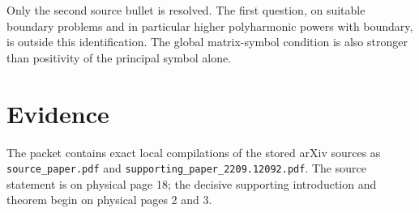 \documentclass[11pt]{article}
\begin{document}
Only the second source bullet is resolved.  The first question, on suitable
boundary problems and in particular higher polyharmonic powers with boundary,
is outside this identification.  The global matrix-symbol condition is also
stronger than positivity of the principal symbol alone.

\section*{Evidence}
The packet contains exact local compilations of the stored arXiv sources as
\texttt{source\_paper.pdf} and
\texttt{supporting\_paper\_2209.12092.pdf}.  The source statement is on
physical page 18; the decisive supporting introduction and theorem begin on
physical pages 2 and 3.
\end{document}

